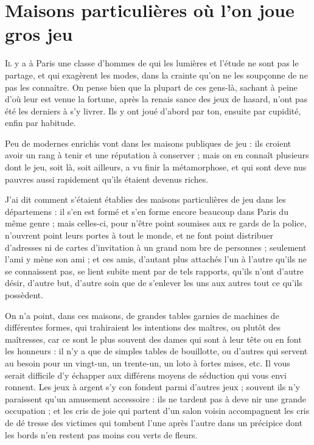 \chapter{Maisons particulières où l'on joue gros jeu}

\lettrine{I}{l} y a à Paris une classe d'hommes
de qui les lumières et l'étude ne sont
pas le partage, et qui exagèrent les
modes, dans la crainte qu'on ne les
soupçonne de ne pas les connaître.
On pense bien que la plupart de ces
gens-là, sachant à peine d'où leur est
venue la fortune, après la renais%
sance des jeux de hasard, n'ont pas
été les derniers à s'y livrer. Ils y ont
joué d'abord par ton, ensuite par
cupidité, enfin par habitude.

Peu de modernes enrichis vont
dans les maisons publiques de jeu :
ils croient avoir un rang à tenir et
une réputation à conserver ; mais
on en connaît plusieurs dont le jeu,
soit là, soit ailleurs, a vu finir la
métamorphose, et qui sont deve%
nus pauvres aussi rapidement qu'ils
étaient devenus riches.

J'ai dit comment s'étaient établies
des maisons particulières de jeu dans
les départemens : il s'en est formé et
s'en forme encore beaucoup dans
Paris du même genre ; mais celles-ci,
pour n'être point soumises aux re%
gards de la police, n'ouvrent point
leurs portes à tout le monde, et ne
font point distribuer d'adresses ni de
cartes d'invitation à un grand nom%
bre de personnes ; seulement l'ami y
mène son ami ; et ces amis, d'autant
plus attachés l'un à l'autre qu'ils ne
se connaissent pas, se lient subite%
ment par de tels rapports, qu'ils n'ont
d'autre désir, d'autre but, d'autre 
soin que de s'enlever les uns aux
autres tout ce qu'ils possèdent.

On n'a point, dans ces maisons,
de grandes tables garnies de machines
de différentes formes, qui trahiraient
les intentions des maîtres, ou plutôt
des maîtresses, car ce sont le plus
souvent des dames qui sont à leur tête
ou en font les honneurs : il n'y a que
de simples tables de bouillotte, ou
d'autres qui servent au besoin pour
un vingt-un, un trente-un, un loto
à fortes mises, etc. Il vous serait
difficile d'y échapper aux différens
moyens de séduction qui vous envi%
ronnent. Les jeux à argent s'y con%
fondent parmi d'autres jeux ; souvent
ils n'y paraissent qu'un amusement
accessoire : ils ne tardent pas à deve%
nir une grande occupation ; et les
cris de joie qui partent d'un salon
voisin accompagnent les cris de dé%
tresse des victimes qui tombent l'une
après l'autre dans un précipice dont
les bords n'en restent pas moins cou%
verts de fleurs.

